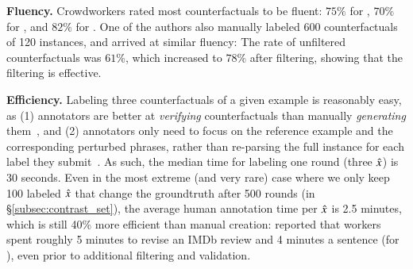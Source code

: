\textbf{Fluency.}
Crowdworkers rated most counterfactuals to be fluent: $75\%$ for \dsst, $70\%$ for \dqqp, and $82\%$ for \dnli.
One of the authors also manually labeled 600 counterfactuals of 120 instances, and arrived at similar fluency:
The rate of unfiltered counterfactuals was $61\%$, which increased to $78\%$ after filtering, showing that the filtering is effective.

\textbf{Efficiency.}
Labeling three counterfactuals of a given example is reasonably easy, as (1) annotators are better at \emph{verifying} counterfactuals than manually \emph{generating} them~\cite{ribeiro2018sear}, and (2) annotators only need to focus on the reference example and the corresponding perturbed phrases, rather than re-parsing the full instance for each label they submit~\cite{Khashabi2020MoreBF}.
As such, the median time for labeling one round (three $\hat{x}$) is 30 seconds.
Even in the most extreme (and very rare) case where we only keep 100 labeled $\hat{x}$ that change the groundtruth after 500 rounds (\sst in \S\ref{subsec:contrast_set}), the average human annotation time per $\hat{x}$ is 2.5 minutes, which is still 40\% more efficient than manual creation:
\citet{kaushik2019learning} reported that workers spent roughly 5 minutes to revise an IMDb review and 4 minutes a sentence (for \nli), even prior to additional filtering and validation.







